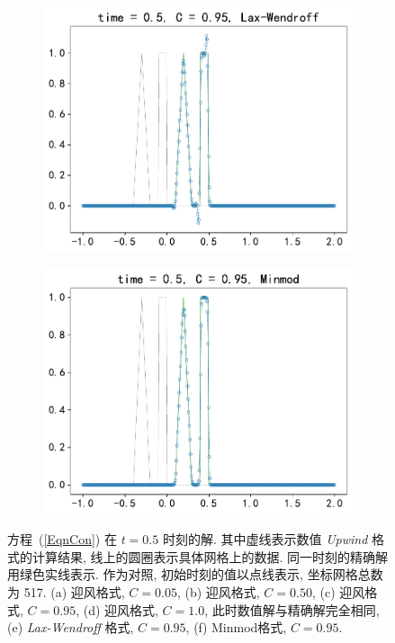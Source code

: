 \documentclass[10.5pt
]{article}
\begin{document}
\begin{figure}
\begin{subfigure}{.48\linewidth}
  \includegraphics[width=\textwidth]{figures/problem1_lax_wendroff0.95.pdf}
  \caption{}
  \label{fig:problem1-5}
\end{subfigure}
\hfill
\begin{subfigure}{.48\linewidth}
  \includegraphics[width=\textwidth]{figures/problem1_limiter0.95.pdf}
  \caption{}
  \label{fig:problem1-6}
\end{subfigure}
\caption{方程~(\ref{EqnCon}) 在 $t=0.5$ 时刻的解. 其中虚线表示数值 \textit{Upwind} 格式的计算结果, 线上的圆圈表示具体网格上的数据. 同一时刻的精确解用绿色实线表示. 作为对照,
  初始时刻的值以点线表示, 坐标网格总数为 517. (a) 迎风格式, $C = 0.05$, (b)  迎风格式, $C = 0.50$, (c)  迎风格式, $C = 0.95$, (d) 迎风格式, $C = 1.0$,
  此时数值解与精确解完全相同, (e) \textit{Lax-Wendroff} 格式, $C = 0.95$,  (f) Minmod格式, $C = 0.95$.} \label{LinearW}
  \label{fig:problem1}%
\end{figure}
\end{document}
